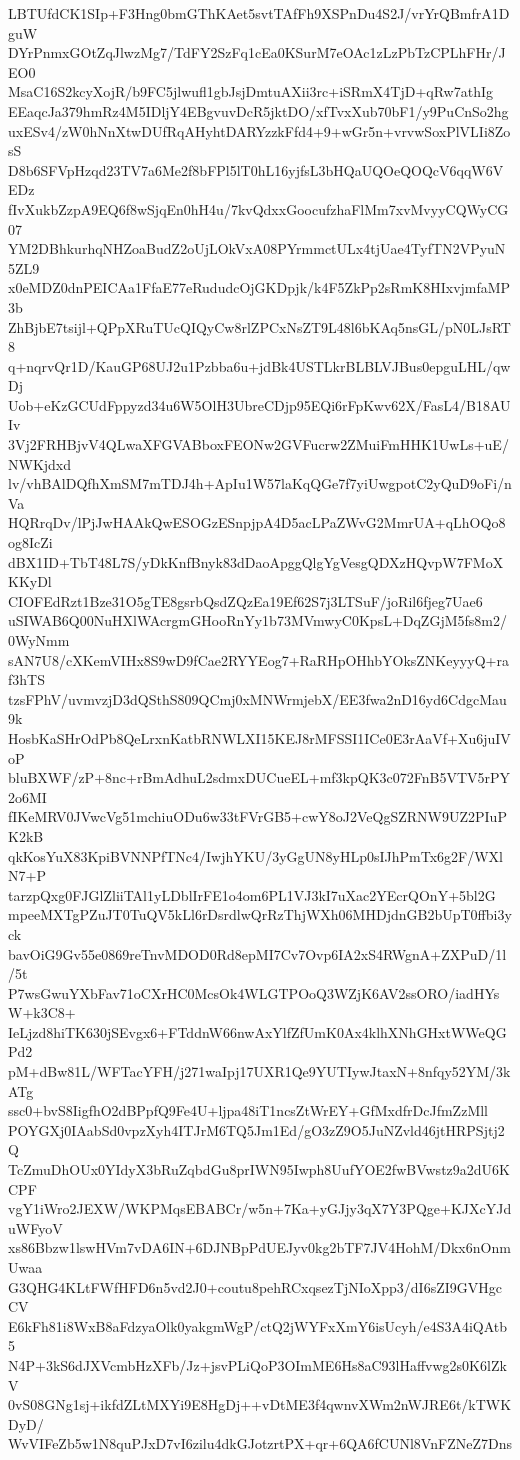 LBTUfdCK1SIp+F3Hng0bmGThKAet5svtTAfFh9XSPnDu4S2J/vrYrQBmfrA1DguW
DYrPnmxGOtZqJlwzMg7/TdFY2SzFq1cEa0KSurM7eOAc1zLzPbTzCPLhFHr/JEO0
MsaC16S2kcyXojR/b9FC5jlwufl1gbJsjDmtuAXii3rc+iSRmX4TjD+qRw7athIg
EEaqcJa379hmRz4M5IDljY4EBgvuvDcR5jktDO/xfTvxXub70bF1/y9PuCnSo2hg
uxESv4/zW0hNnXtwDUfRqAHyhtDARYzzkFfd4+9+wGr5n+vrvwSoxPlVLIi8ZosS
D8b6SFVpHzqd23TV7a6Me2f8bFPl5lT0hL16yjfsL3bHQaUQOeQOQcV6qqW6VEDz
fIvXukbZzpA9EQ6f8wSjqEn0hH4u/7kvQdxxGoocufzhaFlMm7xvMvyyCQWyCG07
YM2DBhkurhqNHZoaBudZ2oUjLOkVxA08PYrmmctULx4tjUae4TyfTN2VPyuN5ZL9
x0eMDZ0dnPEICAa1FfaE77eRududcOjGKDpjk/k4F5ZkPp2sRmK8HIxvjmfaMP3b
ZhBjbE7tsijl+QPpXRuTUcQIQyCw8rlZPCxNsZT9L48l6bKAq5nsGL/pN0LJsRT8
q+nqrvQr1D/KauGP68UJ2u1Pzbba6u+jdBk4USTLkrBLBLVJBus0epguLHL/qwDj
Uob+eKzGCUdFppyzd34u6W5OlH3UbreCDjp95EQi6rFpKwv62X/FasL4/B18AUIv
3Vj2FRHBjvV4QLwaXFGVABboxFEONw2GVFucrw2ZMuiFmHHK1UwLs+uE/NWKjdxd
lv/vhBAlDQfhXmSM7mTDJ4h+ApIu1W57laKqQGe7f7yiUwgpotC2yQuD9oFi/nVa
HQRrqDv/lPjJwHAAkQwESOGzESnpjpA4D5acLPaZWvG2MmrUA+qLhOQo8og8IcZi
dBX1ID+TbT48L7S/yDkKnfBnyk83dDaoApggQlgYgVesgQDXzHQvpW7FMoXKKyDl
CIOFEdRzt1Bze31O5gTE8gsrbQsdZQzEa19Ef62S7j3LTSuF/joRil6fjeg7Uae6
uSIWAB6Q00NuHXlWAcrgmGHooRnYy1b73MVmwyC0KpsL+DqZGjM5fs8m2/0WyNmm
sAN7U8/cXKemVIHx8S9wD9fCae2RYYEog7+RaRHpOHhbYOksZNKeyyyQ+raf3hTS
tzsFPhV/uvmvzjD3dQSthS809QCmj0xMNWrmjebX/EE3fwa2nD16yd6CdgcMau9k
HosbKaSHrOdPb8QeLrxnKatbRNWLXI15KEJ8rMFSSI1ICe0E3rAaVf+Xu6juIVoP
bluBXWF/zP+8nc+rBmAdhuL2sdmxDUCueEL+mf3kpQK3c072FnB5VTV5rPY2o6MI
fIKeMRV0JVwcVg51mchiuODu6w33tFVrGB5+cwY8oJ2VeQgSZRNW9UZ2PIuPK2kB
qkKosYuX83KpiBVNNPfTNc4/IwjhYKU/3yGgUN8yHLp0sIJhPmTx6g2F/WXlN7+P
tarzpQxg0FJGlZliiTAl1yLDblIrFE1o4om6PL1VJ3kI7uXac2YEcrQOnY+5bl2G
mpeeMXTgPZuJT0TuQV5kLl6rDsrdlwQrRzThjWXh06MHDjdnGB2bUpT0ffbi3yck
bavOiG9Gv55e0869reTnvMDOD0Rd8epMI7Cv7Ovp6IA2xS4RWgnA+ZXPuD/1l/5t
P7wsGwuYXbFav71oCXrHC0McsOk4WLGTPOoQ3WZjK6AV2ssORO/iadHYsW+k3C8+
IeLjzd8hiTK630jSEvgx6+FTddnW66nwAxYlfZfUmK0Ax4klhXNhGHxtWWeQGPd2
pM+dBw81L/WFTacYFH/j271waIpj17UXR1Qe9YUTIywJtaxN+8nfqy52YM/3kATg
ssc0+bvS8IigfhO2dBPpfQ9Fe4U+ljpa48iT1ncsZtWrEY+GfMxdfrDcJfmZzMll
POYGXj0IAabSd0vpzXyh4ITJrM6TQ5Jm1Ed/gO3zZ9O5JuNZvld46jtHRPSjtj2Q
TcZmuDhOUx0YIdyX3bRuZqbdGu8prIWN95Iwph8UufYOE2fwBVwstz9a2dU6KCPF
vgY1iWro2JEXW/WKPMqsEBABCr/w5n+7Ka+yGJjy3qX7Y3PQge+KJXcYJduWFyoV
xs86Bbzw1lswHVm7vDA6IN+6DJNBpPdUEJyv0kg2bTF7JV4HohM/Dkx6nOnmUwaa
G3QHG4KLtFWfHFD6n5vd2J0+coutu8pehRCxqsezTjNIoXpp3/dI6sZI9GVHgcCV
E6kFh81i8WxB8aFdzyaOlk0yakgmWgP/ctQ2jWYFxXmY6isUcyh/e4S3A4iQAtb5
N4P+3kS6dJXVcmbHzXFb/Jz+jsvPLiQoP3OImME6Hs8aC93lHaffvwg2s0K6lZkV
0vS08GNg1sj+ikfdZLtMXYi9E8HgDj++vDtME3f4qwnvXWm2nWJRE6t/kTWKDyD/
WvVIFeZb5w1N8quPJxD7vI6zilu4dkGJotzrtPX+qr+6QA6fCUNl8VnFZNeZ7Dns
